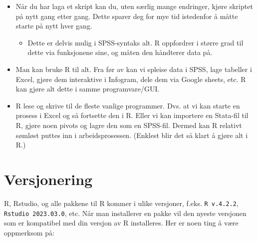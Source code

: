 \documentclass[
  letterpaper,
  DIV=11,
  numbers=noendperiod]{scrreprt}
\providecommand{\tightlist}{%
  \setlength{\itemsep}{0pt}\setlength{\parskip}{0pt}}\usepackage{longtable,booktabs,array}
\begin{document}
\begin{itemize}
\tightlist
\item
  Når du har laga et skript kan du, uten særlig mange endringer, kjøre
  skriptet på nytt gang etter gang. Dette sparer deg for mye tid
  istedenfor å måtte starte på nytt hver gang.

  \begin{itemize}
  \tightlist
  \item
    Dette er delvis mulig i SPSS-syntaks alt. R oppfordrer i større grad
    til dette via funksjonene sine, og måten den håndterer data på.
  \end{itemize}
\item
  Man kan bruke R til alt. Fra før av kan vi spleise data i SPSS, lage
  tabeller i Excel, gjøre dem interaktive i Infogram, dele dem via
  Google sheets, etc. R kan gjøre alt dette i samme programvare/GUI.
\item
  R lese og skrive til de fleste vanlige programmer. Dvs. at vi kan
  starte en prosess i Excel og så fortsette den i R. Eller vi kan
  importere en Stata-fil til R, gjøre noen pivots og lagre den som en
  SPSS-fil. Dermed kan R relativt sømløst puttes inn i arbeidsprosessen.
  (Enklest blir det så klart å gjøre alt i R.)
\end{itemize}

\hypertarget{sec-versjering}{%
\section{Versjonering}\label{sec-versjering}}

R, Rstudio, og alle pakkene til R kommer i ulike versjoner, f.eks.
\texttt{R\ v.4.2.2}, \texttt{Rstudio\ 2023.03.0}, etc. Når man
installerer en pakke vil den nyeste versjonen som er kompatibel med din
versjon av R installeres. Her er noen ting å være oppmerksom på:
\end{document}
